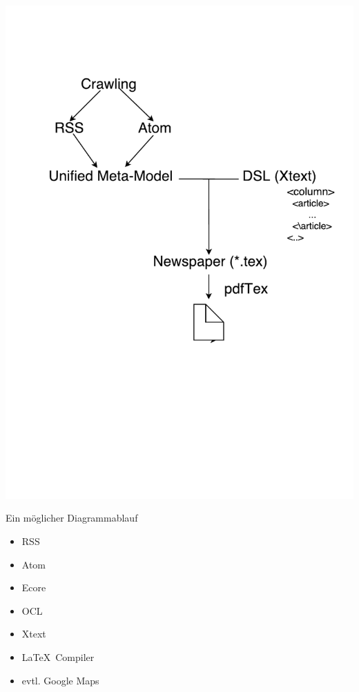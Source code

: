 \documentclass{article}
\begin{document}
\begin{multicols}{3}
{		\includegraphics[trim=0 180 0 80,clip,width=\columnwidth]{modelbasedtimesDiagram.pdf}
		\centerline{Ein möglicher Diagrammablauf}
		\closearticle
		
		\begin{itemize}
			\item RSS
			\item Atom
			\item Ecore
			\item OCL
			\item Xtext
			\item \LaTeX\ Compiler
			\item evtl. Google Maps
		\end{itemize}
		\closearticle
		}


\end{multicols}
\end{document}
